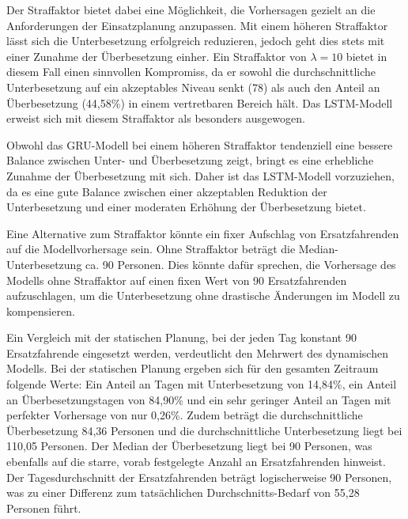 \documentclass[%
pdftex,
oneside,			%
11pt,				%
parskip=half,		%
headheight = 12pt,	%
headsepline,		%
footsepline,		%
footheight = 16pt,	%
abstracton,		%
DIV=calc,		%
BCOR=8mm,		%
headinclude=false,	%
footinclude=false,	%
listof=totoc,		%
toc=bibliography,	%
]{scrreprt}	%
\begin{document}
            Der Straffaktor bietet dabei eine Möglichkeit, die Vorhersagen gezielt an die Anforderungen der Einsatzplanung anzupassen. 
            Mit einem höheren Straffaktor lässt sich die Unterbesetzung erfolgreich reduzieren, jedoch geht dies stets mit einer Zunahme der Überbesetzung einher. 
            Ein Straffaktor von \(\lambda = 10\) bietet in diesem Fall einen sinnvollen Kompromiss, da er sowohl die durchschnittliche Unterbesetzung auf ein akzeptables Niveau senkt (78) als auch den Anteil an Überbesetzung (44,58\%) in einem vertretbaren Bereich hält. 
            Das LSTM-Modell erweist sich mit diesem Straffaktor als besonders ausgewogen.

            Obwohl das GRU-Modell bei einem höheren Straffaktor tendenziell eine bessere Balance zwischen Unter- und Überbesetzung zeigt, bringt es eine erhebliche Zunahme der Überbesetzung mit sich. 
            Daher ist das LSTM-Modell vorzuziehen, da es eine gute Balance zwischen einer akzeptablen Reduktion der Unterbesetzung und einer moderaten Erhöhung der Überbesetzung bietet.

            Eine Alternative zum Straffaktor könnte ein fixer Aufschlag von Ersatzfahrenden auf die Modellvorhersage sein. 
            Ohne Straffaktor beträgt die Median-Unterbesetzung ca. 90 Personen. 
            Dies könnte dafür sprechen, die Vorhersage des Modells ohne Straffaktor auf einen fixen Wert von 90 Ersatzfahrenden aufzuschlagen, um die Unterbesetzung ohne drastische Änderungen im Modell zu kompensieren.

            Ein Vergleich mit der statischen Planung, bei der jeden Tag konstant 90 Ersatzfahrende eingesetzt werden, verdeutlicht den Mehrwert des dynamischen Modells. 
            Bei der statischen Planung ergeben sich für den gesamten Zeitraum folgende Werte: 
            Ein Anteil an Tagen mit Unterbesetzung von 14,84\%, ein Anteil an Überbesetzungstagen von 84,90\% und ein sehr geringer Anteil an Tagen mit perfekter Vorhersage von nur 0,26\%. 
            Zudem beträgt die durchschnittliche Überbesetzung 84,36 Personen und die durchschnittliche Unterbesetzung liegt bei 110,05 Personen. 
            Der Median der Überbesetzung liegt bei 90 Personen, was ebenfalls auf die starre, vorab festgelegte Anzahl an Ersatzfahrenden hinweist. 
            Der Tagesdurchschnitt der Ersatzfahrenden beträgt logischerweise 90 Personen, was zu einer Differenz zum tatsächlichen Durchschnitts-Bedarf von 55,28 Personen führt.

\end{document}
